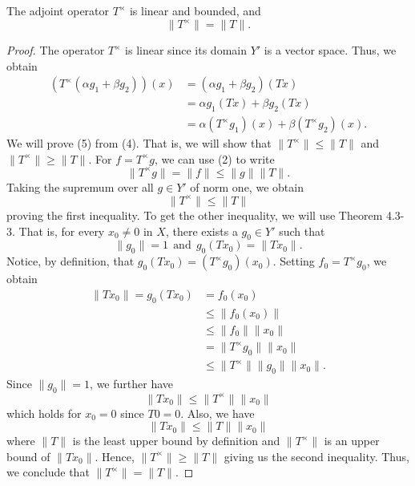 \begin{theorem}
    The adjoint operator \( T^{\times}  \) is linear and bounded, and 
    \[  \|T^{\times}\| = \|T\|. \tag{5}\]
\end{theorem}
\begin{proof}
The operator \( T^{\times} \) is linear since its domain \( Y' \) is a vector space. Thus, we obtain
\begin{align*}
    (T^{\times}(\alpha {g}_{1} + \beta {g}_{2}))(x) &= (\alpha {g}_{1} + \beta {g}_{2})(Tx) \\
                                                    &= \alpha {g}_{1} (Tx) + \beta {g}_{2}(Tx) \\
                                                    &= \alpha (T^{\times}{g}_{1})(x) + \beta (T^{\times} {g}_{2})(x).
\end{align*}
We will prove (5) from (4). That is, we will show that \( \|T^{\times}\| \leq \|T\| \) and \( \|T^{\times}\| \geq \|T\| \). For \( f = T^{\times} g  \), we can use (2) to write
\[  \|T^{\times} g \| = \|f\| \leq \|g\| \|T\|. \]
Taking the supremum over all \( g \in Y' \) of norm one, we obtain 
\[  \|T^{\times}\| \leq \|T\| \]
proving the first inequality. To get the other inequality, we will use Theorem 4.3-3. That is, for every \( {x}_{0} \neq 0  \) in \( X  \), there exists a \( {g}_{0} \in Y' \) such that 
\[  \|{g}_{0}\| = 1  \ \ \text{and} \ \ {g}_{0}(T {x}_{0}) = \|T {x}_{0}\|. \]
Notice, by definition, that \( {g}_{0}(T {x}_{0}) = (T^{\times} {g}_{0})({x}_{0}) \). Setting \( {f}_{0} = T^{\times}{g}_{0} \), we obtain
\begin{align*}
    \|T {x}_{0} \| = {g}_{0}(T {x}_{0}) &= {f}_{0}({x}_{0}) \\
                                    &\leq \|{f}_{0}({x}_{0})\| \\
                                        &\leq \|{f}_{0}\| \|{x}_{0}\| \\
                                        &= \|T^{\times} {g}_{0}\| \|{x}_{0}\| \\
                                        &\leq \|T^{\times}\| \|{g}_{0}\| \|{x}_{0}\|.
\end{align*}
Since \( \|{g}_{0}\| = 1  \), we further have
\[  \|T {x}_{0} \| \leq \|T^{\times}\| \|{x}_{0}\| \]
which holds for \( {x}_{0} = 0  \) since \( T 0 = 0  \). Also, we have
\[  \|T {x}_{0} \| \leq \|T \| \|{x}_{0}\| \]
where \( \|T\| \) is the least upper bound by definition and \( \|T^{\times}\|  \) is an upper bound of \( \|T {x}_{0}\| \). Hence, \( \|T^{\times}\| \geq \|T\| \) giving us the second inequality. Thus, we conclude that \( \|T^{\times}\| = \|T\| \).
\end{proof}

